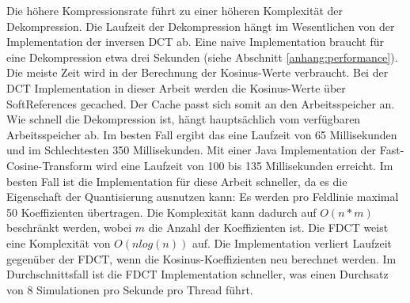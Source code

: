 Die höhere Kompressionsrate führt zu einer höheren Komplexität der Dekompression. Die Laufzeit der Dekompression hängt im Wesentlichen von der Implementation der inversen DCT ab. Eine naive Implementation braucht für eine Dekompression etwa drei Sekunden (siehe Abschnitt \ref{anhang:performance}). Die meiste Zeit wird in der Berechnung der Kosinus-Werte verbraucht. Bei der DCT Implementation in dieser Arbeit werden die Kosinus-Werte über SoftReferences gecached. Der Cache passt sich somit an den Arbeitsspeicher an. Wie schnell die Dekompression ist, hängt hauptsächlich vom verfügbaren Arbeitsspeicher ab. Im besten Fall ergibt das eine Laufzeit von 65 Millisekunden und im Schlechtesten 350 Millisekunden. Mit einer Java Implementation der Fast-Cosine-Transform wird eine Laufzeit von 100 bis 135 Millisekunden erreicht. Im besten Fall ist die Implementation für diese Arbeit schneller, da es die Eigenschaft der Quantisierung ausnutzen kann: Es werden pro Feldlinie maximal 50 Koeffizienten übertragen. Die Komplexität kann dadurch auf $O(n*m)$ beschränkt werden, wobei $m$ die Anzahl der Koeffizienten ist. Die FDCT weist eine Komplexität von $O(n log(n))$ auf. Die Implementation verliert Laufzeit gegenüber der FDCT, wenn die Kosinus-Koeffizienten neu berechnet werden. Im Durchschnittsfall ist die FDCT Implementation schneller, was einen Durchsatz von 8 Simulationen pro Sekunde pro Thread führt.